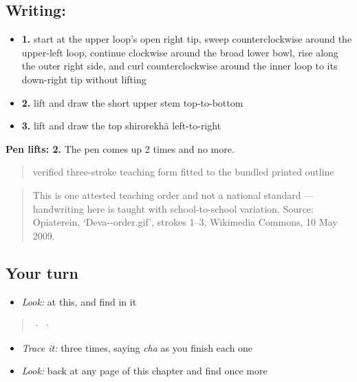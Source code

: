 \subsection*{Writing: }

\begin{itemize}
\raggedright
  \item \textbf{1.} start at the upper loop's open right tip, sweep counterclockwise around the upper-left loop, continue clockwise around the broad lower bowl, rise along the outer right side, and curl counterclockwise around the inner loop to its down-right tip without lifting
  \item \textbf{2.} lift and draw the short upper stem top-to-bottom
  \item \textbf{3.} lift and draw the top shirorekhā left-to-right
\end{itemize}

\textbf{Pen lifts: 2.} The pen comes up 2 times and no more.

\begin{quote}
verified three-stroke teaching form fitted to the bundled printed outline
\end{quote}

\begin{quote}
This is one attested teaching order and not a national standard — handwriting here is taught with school-to-school variation. Source: Opiaterein, ‘Deva--order.gif’, strokes 1–3, Wikimedia Commons, 10 May 2009.
\end{quote}

\subsection*{Your turn}
\begin{itemize}
\raggedright
  \item \emph{Look:} at this, and find  in it
\end{itemize}

\begin{quote}
  ·    ·  
\end{quote}

\begin{itemize}
\raggedright
  \item \emph{Trace it:}  three times, saying \emph{cha} as you finish each one
  \item \emph{Look:} back at any page of this chapter and find  once more
\end{itemize}

